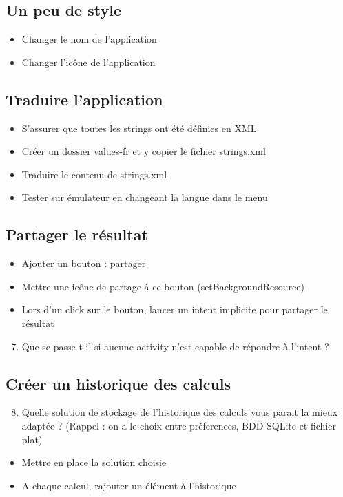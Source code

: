 \documentclass{article}
\begin{document}
\subsection{Un peu de style}
\begin{itemize}
\item Changer le nom de l'application
\item Changer l'icône de l'application
\end{itemize}
\subsection{Traduire l'application}
\begin{itemize}
\item S'assurer que toutes les strings ont été définies en XML
\item Créer un dossier values-fr et y copier le fichier strings.xml
\item Traduire le contenu de strings.xml
\item Tester sur émulateur en changeant la langue dans le menu
\end{itemize}
\subsection{Partager le résultat}
\begin{itemize}
\item Ajouter un bouton : partager
\item Mettre une icône de partage à ce bouton (setBackgroundResource)
\item Lors d'un click sur le bouton, lancer un intent implicite pour partager le résultat
\end{itemize}
\begin{enumerate}
 \setcounter{enumi}{6}
\item Que se passe-t-il si aucune activity n'est capable de répondre à l'intent
?
\end{enumerate}
\subsection{Créer un historique des calculs}
\begin{enumerate}
 \setcounter{enumi}{7}
\item Quelle solution de stockage de l'historique des calculs vous parait la mieux adaptée ? (Rappel : on a le choix entre préferences, BDD SQLite et fichier plat) 
\end{enumerate}
\begin{itemize}
\item Mettre en place la solution choisie
\item A chaque calcul, rajouter un élément à l'historique
\end{itemize}
\end{document}
